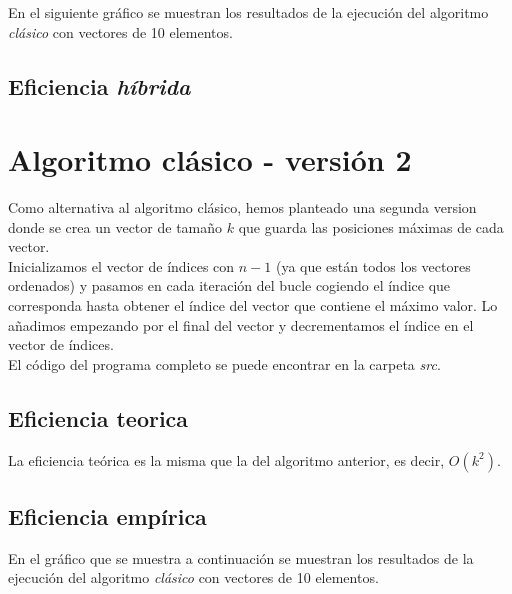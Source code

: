 \documentclass[11pt]{article}
\begin{document}
En el siguiente gráfico se muestran los resultados de la
ejecución del algoritmo \textit{clásico} con vectores de 10 elementos.

\begin{center}
	
\end{center}

\subsection*{Eficiencia \textit{híbrida}}

\section*{Algoritmo clásico - versión 2}
 
 Como alternativa al algoritmo clásico, hemos planteado una segunda version donde se crea un vector de tamaño $k$ que guarda las posiciones máximas de cada vector.\\
 
Inicializamos el vector de índices con $n - 1$ (ya que están todos los vectores ordenados) y pasamos en cada iteración del bucle cogiendo el índice que corresponda hasta obtener el índice del vector que contiene el máximo valor. Lo añadimos empezando por el final del vector y decrementamos el índice en el vector de índices. \\
 
 El código del programa completo se puede encontrar en la carpeta \textit{src}.\\
 
 
 
 \subsection*{Eficiencia teorica}
 
 La eficiencia teórica es la misma que la del algoritmo anterior, es decir, $O(k^2)$.
 
 \subsection*{Eficiencia empírica}
 
 En el gráfico que se muestra a continuación se muestran los resultados de la
 ejecución del algoritmo \textit{clásico} con vectores de 10 elementos.
 
 \begin{center}
 	
 \end{center}
 
\end{document}
